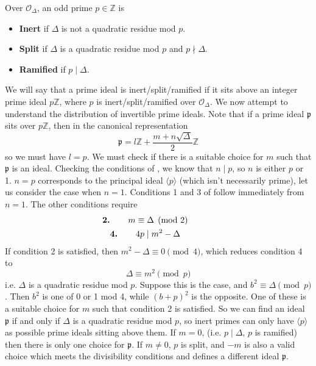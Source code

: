 \documentclass[honours,12pt]{unswthesis}
\newcommand{\Z}{\mathbb{Z}} %
\newcommand{\order}{\mathcal{O}} %
\newcommand{\divides}{\mathrel{|}}
\newcommand{\lnote}[1]{\llap{$#1$\hspace{0.75cm}}}
\numberwithin{equation}{section}
\begin{document}
\noindent
Over $\order_\Delta$, an odd prime $p \in \Z$ is
\begin{itemize}
    \item \textbf{Inert} if $\Delta$ is not a quadratic residue mod $p$.
    \item \textbf{Split} if $\Delta$ is a quadratic residue mod $p$ and $p \nmid \Delta$.
    \item \textbf{Ramified} if $p \divides \Delta$.
\end{itemize}

\vspace{2mm}
\noindent
We will say that a prime ideal is inert/split/ramified if it sits above an integer prime ideal $p\Z$, where $p$ is inert/split/ramified over $\order_\Delta$.
We now attempt to understand the distribution of invertible prime ideals.
Note that if a prime ideal $\mathfrak{p}$ sits over $p\Z$, then in the canonical representation
$$\mathfrak{p} = l\Z + \frac{m + n\sqrt\Delta}{2}\Z$$
so we must have $l = p$.
We must check if there is a suitable choice for $m$ such that $\mathfrak{p}$ is an ideal.
Checking the conditions of , we know that $n \divides p$, so $n$ is either $p$ or 1.
$n = p$ corresponds to the principal ideal $\langle p \rangle$ (which isn't necessarily prime), let us consider the case when $n = 1$.
Conditions 1 and 3 of  follow immediately from $n = 1$.
The other conditions require
\begin{gather*}
    \lnote{\textbf{2.}} m \equiv \Delta \pmod{2} \\
    \lnote{\textbf{4.}} 4p \divides m^2 - \Delta
\end{gather*}
If condition 2 is satisfied, then $m^2 - \Delta \equiv 0 \pmod{4}$, which reduces condition 4 to
$$\Delta \equiv m^2 \pmod{p}$$
i.e. $\Delta$ is a quadratic residue mod $p$.
Suppose this is the case, and $b^2 \equiv \Delta \pmod{p}$.
Then $b^2$ is one of 0 or 1 mod 4, while $(b+p)^2$ is the opposite.
One of these is a suitable choice for $m$ such that condition 2 is satisfied.
So we can find an ideal $\mathfrak{p}$ if and only if $\Delta$ is a quadratic residue mod $p$, so inert primes can only have $\langle p \rangle$ as possible prime ideals sitting above them.
If $m = 0$, (i.e. $p \divides \Delta$, $p$ is ramified) then there is only one choice for $\mathfrak{p}$.
If $m \neq 0$, $p$ is split, and $-m$ is also a valid choice which meets the divisibility conditions and defines a different ideal $\mathfrak{p}$.
\end{document}

